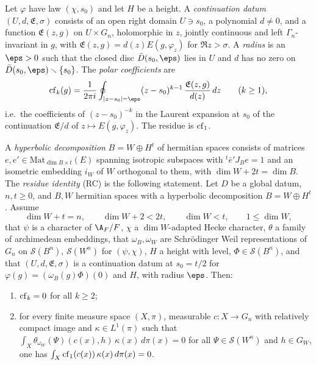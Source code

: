 \begin{definition}\label{pf:liftinj:contdef}
Let $\varphi$ have law $(\chi,s_0)$ and let $H$ be a height. A \emph{continuation datum} $(U,d,\mathfrak E,\sigma)$ consists of an open
right domain $U\ni s_0$, a polynomial $d\ne0$, and a function $\mathfrak E(z,g)$ on $U\times G_n$, holomorphic in $z$, jointly continuous and
left $\Gamma_n$-invariant in $g$, with $\mathfrak E(z,g)=d(z)E(g,\varphi_z)$ for $\Re z>\sigma$. A \emph{radius} is an $\eps>0$ such that the
closed disc $\bar D(s_0,\eps)$ lies in $U$ and $d$ has no zero on $\bar D(s_0,\eps)\smallsetminus\{s_0\}$. The \emph{polar coefficients} are
\begin{equation}\label{eq:pf:liftinj:cf}
\liftinjres_k(g)=\frac1{2\pi i}\oint_{|z-s_0|=\eps}(z-s_0)^{k-1}\,\frac{\mathfrak E(z,g)}{d(z)}\,dz\qquad(k\ge1),
\end{equation}
i.e.\ the coefficients of $(z-s_0)^{-k}$ in the Laurent expansion at $s_0$ of the continuation $\mathfrak E/d$ of
$z\mapsto E(g,\varphi_z)$. The residue is $\operatorname{cf}_1$.
\end{definition}

\begin{definition}\label{pf:liftinj:rescoredef}
A \emph{hyperbolic decomposition} $B=W\oplus H^t$ of hermitian spaces consists of matrices $e,e'\in\mathrm{Mat}_{\dim B\times t}(E)$ spanning
isotropic subspaces with ${}^t\bar e'J_Be=1$ and an isometric embedding $i_W$ of $W$ orthogonal to them, with $\dim W+2t=\dim B$. The
\emph{residue identity} (RC) is the following statement. Let $D$ be a global datum, $n,t\ge0$, and $B,W$ hermitian spaces with a hyperbolic
decomposition $B=W\oplus H^t$. Assume
\[
\dim W+t=n,\qquad \dim W+2<2t,\qquad \dim W<t,\qquad 1\le\dim W,
\]
that $\psi$ is a character of $\A_F/F$, $\chi$ a $\dim W$-adapted Hecke character, $\theta$ a family of archimedean embeddings, that
$\omega_B,\omega_W$ are Schr\"odinger Weil representations of $G_n$ on $\mathcal S(B^n)$, $\mathcal S(W^n)$ for $(\psi,\chi)$, $H$ a height with
level, $\Phi\in\mathcal S(B^n)$, and that $(U,d,\mathfrak E,\sigma)$ is a continuation datum at $s_0=t/2$ for $\varphi(g)=(\omega_B(g)\Phi)(0)$ and
$H$, with radius $\eps$. Then:
\begin{enumerate}[label=(\roman*)]
\item $\operatorname{cf}_k=0$ for all $k\ge2$;
\item for every finite measure space $(X,\pi)$, measurable $c:X\to G_n$ with relatively compact image and
$\kappa\in L^1(\pi)$ such that $\int_X\theta_{\omega_W}(\Psi)(c(x),h)\,\kappa(x)\,d\pi(x)=0$ for all $\Psi\in\mathcal S(W^n)$ and
$h\in G_W$, one has $\int_X\operatorname{cf}_1(c(x))\,\kappa(x)\,d\pi(x)=0$.
\end{enumerate}
\end{definition}

